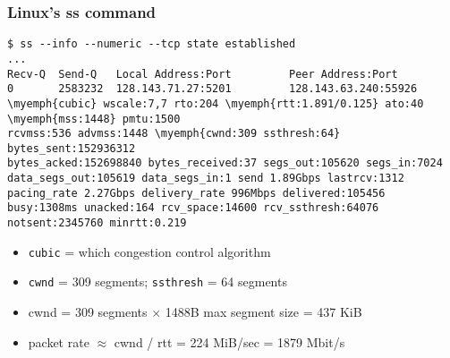 \begin{FragileFrame}
\frametitle{Linux's ss command}
\begin{Verbatim}[commandchars=\\\{\},fontsize=\fontsize{10}{11}]
$ ss --info --numeric --tcp state established
...
Recv-Q  Send-Q   Local Address:Port         Peer Address:Port 
0       2583232  128.143.71.27:5201         128.143.63.240:55926
\myemph{cubic} wscale:7,7 rto:204 \myemph{rtt:1.891/0.125} ato:40 \myemph{mss:1448} pmtu:1500
rcvmss:536 advmss:1448 \myemph{cwnd:309 ssthresh:64} bytes_sent:152936312
bytes_acked:152698840 bytes_received:37 segs_out:105620 segs_in:7024
data_segs_out:105619 data_segs_in:1 send 1.89Gbps lastrcv:1312
pacing_rate 2.27Gbps delivery_rate 996Mbps delivered:105456
busy:1308ms unacked:164 rcv_space:14600 rcv_ssthresh:64076
notsent:2345760 minrtt:0.219
\end{Verbatim}
\begin{itemize}
\item \texttt{cubic} = which congestion control algorithm
\item \texttt{cwnd} = 309 segments; \texttt{ssthresh} = 64 segments
\item cwnd = 309 segments $\times$ 1488B max segment size = 437 KiB
\item packet rate $\approx$ cwnd / rtt = 224 MiB/sec = 1879 Mbit/s
\end{itemize}
\end{FragileFrame}
